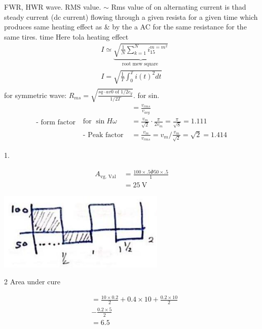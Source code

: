 \documentclass[12pt, a4paper]{article}
\newcommand{\figwidth}{8cm}
\begin{document}
	FWR, HWR wave.
	RMS value.
$\sim$ Rms value of on alternating current is thad steady current (dc current) flowing through a given resista for a given time which produces same heating effect as \& by the a AC for the same resistance for the same tires. time
	Here tola heating effect
	$$
		\begin{aligned}
			 & I \simeq \underbrace{\sqrt{\frac{1}{N} \sum_{k=1}^N i_{15}^{m=m^2}}}_{\text {root mew square }} \\
			 & I=\sqrt{\frac{1}{T} \int_0^T i(t)^2 d t}                                                        \\
			 &
		\end{aligned}
	$$
	for symmetric wave: $R_{m s}=\sqrt{\frac{s q \cdot a v 0 \text { of } 1 / 2 c_y}{1 / 2 T}}$.
	for sin.
	$$
		\text { - form factor } \begin{aligned}
			                            & =\frac{v_{r m s}}{v_{a v g}}                                             \\
			\text { for } \sin H \omega & =\frac{v_m}{\sqrt{2}} \cdot \frac{\pi}{2 v_m}=\frac{\pi}{\sqrt{8}}=1.111 \\
			\text { - Peak factor }     & =\frac{v_m}{v_{r m s}}=v_m / \frac{v_m}{\sqrt{2}}=\sqrt{2}=1.414
		\end{aligned}
	$$

	1.

	$$
		\begin{aligned}
			A_{\text {vg. Val }} & =\frac{100 \times .5 \bar{\Phi} 50 \times .5}{1} \\
			                     & =25 \mathrm{~V}
		\end{aligned}
	$$

	\begin{center}
		\includegraphics[max width=\figwidth]{2024_06_15_74bbabba7981675b0d49g-01(1)}
	\end{center}

	2 Area under cure

	$$
		\begin{aligned}
			 & =\frac{10 \times 0.2}{2}+0.4 \times 10+\frac{0.2 \times 10}{2} \\
			 & -\frac{0.2 \times 5}{2}                                        \\
			 & =6.5
		\end{aligned}
	$$
\end{document}
